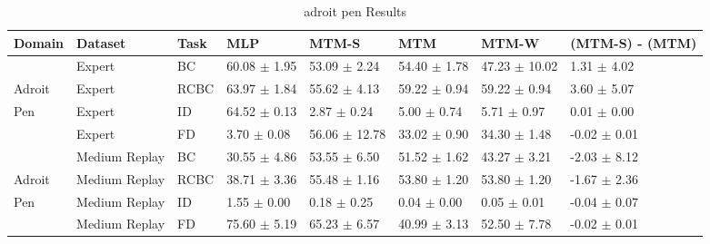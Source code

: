 \begin{table*}
  \small
  \caption{adroit pen Results}
  \label{tab:adroit_pen}
  \centering
  \begin{tabular}{l l l l l l l l}
    \toprule
Domain &       Dataset & Task &              MLP &             MTM-S &              MTM &             MTM-W &                                   (MTM-S) - (MTM) \\
    \midrule
       &        Expert &   BC & 60.08 $\pm$ 1.95 &  53.09 $\pm$ 2.24 & 54.40 $\pm$ 1.78 & 47.23 $\pm$ 10.02 &  \textcolor[rgb]{0.00,0.50,0.00}{1.31 $\pm$ 4.02} \\
Adroit &        Expert & RCBC & 63.97 $\pm$ 1.84 &  55.62 $\pm$ 4.13 & 59.22 $\pm$ 0.94 &  59.22 $\pm$ 0.94 &     \textcolor[rgb]{0.0,1.0,0.0}{3.60 $\pm$ 5.07} \\
   Pen &        Expert &   ID & 64.52 $\pm$ 0.13 &   2.87 $\pm$ 0.24 &  5.00 $\pm$ 0.74 &   5.71 $\pm$ 0.97 &  \textcolor[rgb]{0.00,0.00,0.00}{0.01 $\pm$ 0.00} \\
       &        Expert &   FD &  3.70 $\pm$ 0.08 & 56.06 $\pm$ 12.78 & 33.02 $\pm$ 0.90 &  34.30 $\pm$ 1.48 &                                  -0.02 $\pm$ 0.01 \\
    \midrule
       & Medium Replay &   BC & 30.55 $\pm$ 4.86 &  53.55 $\pm$ 6.50 & 51.52 $\pm$ 1.62 &  43.27 $\pm$ 3.21 & \textcolor[rgb]{1.00,0.00,0.00}{-2.03 $\pm$ 8.12} \\
Adroit & Medium Replay & RCBC & 38.71 $\pm$ 3.36 &  55.48 $\pm$ 1.16 & 53.80 $\pm$ 1.20 &  53.80 $\pm$ 1.20 & \textcolor[rgb]{0.82,0.00,0.00}{-1.67 $\pm$ 2.36} \\
   Pen & Medium Replay &   ID &  1.55 $\pm$ 0.00 &   0.18 $\pm$ 0.25 &  0.04 $\pm$ 0.00 &   0.05 $\pm$ 0.01 &                                  -0.04 $\pm$ 0.07 \\
       & Medium Replay &   FD & 75.60 $\pm$ 5.19 &  65.23 $\pm$ 6.57 & 40.99 $\pm$ 3.13 &  52.50 $\pm$ 7.78 &                                  -0.02 $\pm$ 0.01 \\
    \midrule
    \bottomrule
  \end{tabular}
\end{table*}
